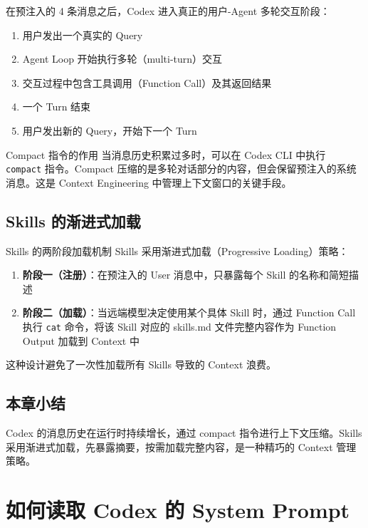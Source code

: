 \documentclass[a4paper]{article}
\begin{document}
在预注入的 4 条消息之后，Codex 进入真正的用户-Agent 多轮交互阶段：

\begin{enumerate}
    \item 用户发出一个真实的 Query
    \item Agent Loop 开始执行多轮（multi-turn）交互
    \item 交互过程中包含工具调用（Function Call）及其返回结果
    \item 一个 Turn 结束
    \item 用户发出新的 Query，开始下一个 Turn
\end{enumerate}

\begin{importantbox}{Compact 指令的作用}
当消息历史积累过多时，可以在 Codex CLI 中执行 \texttt{compact} 指令。Compact 压缩的是多轮对话部分的内容，但会保留预注入的系统消息。这是 Context Engineering 中管理上下文窗口的关键手段。
\end{importantbox}

\subsection{Skills 的渐进式加载}

\begin{knowledgebox}{Skills 的两阶段加载机制}
Skills 采用渐进式加载（Progressive Loading）策略：
\begin{enumerate}
    \item \textbf{阶段一（注册）}：在预注入的 User 消息中，只暴露每个 Skill 的名称和简短描述
    \item \textbf{阶段二（加载）}：当远端模型决定使用某个具体 Skill 时，通过 Function Call 执行 \texttt{cat} 命令，将该 Skill 对应的 skills.md 文件完整内容作为 Function Output 加载到 Context 中
\end{enumerate}
这种设计避免了一次性加载所有 Skills 导致的 Context 浪费。
\end{knowledgebox}

\subsection{本章小结}

Codex 的消息历史在运行时持续增长，通过 compact 指令进行上下文压缩。Skills 采用渐进式加载，先暴露摘要，按需加载完整内容，是一种精巧的 Context 管理策略。


\section{如何读取 Codex 的 System Prompt}
\end{document}
